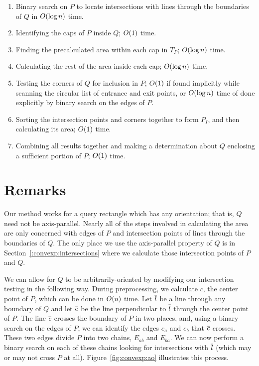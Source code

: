 \begin{enumerate}
 \item Binary search on $P$ to locate intersections with lines through the  boundaries of $Q$ in $O\!\left(\log{n}\right)$ time.
 
 \item Identifying the caps of $P$ inside $Q$; $O\!\left(1\right)$ time.

 \item Finding the precalculated area within each cap in $T_P$; $O\!\left(\log{n}\right)$ time.

 \item Calculating the rest of the area inside each cap; $O\!\left(\log{n}\right)$ time.

 \item Testing the corners of $Q$ for inclusion in $P$; $O\!\left(1\right)$ if found implicitly while scanning the circular list of entrance and exit points, or $O\!\left(\log{n}\right)$ time of done explicitly by binary search on the edges of $P$.
 
 \item Sorting the intersection points and corners together to form $P_I$, and then calculating its area; $O\!\left(1\right)$ time.
 
 \item Combining all results together and making a determination about $Q$ enclosing a sufficient portion of $P$; $O\!\left(1\right)$ time.
 
\end{enumerate}


\section{Remarks}
\label{:convexp:remarks}

Our method works for a query rectangle which has any orientation; that is, $Q$ need not be axis-parallel. Nearly all of the steps involved in calculating the area are only concerned with edges of $P$ and intersection points of lines through the boundaries of $Q$. The only place we use the axis-parallel property of $Q$ is in Section~\ref{:convexp:intersections} where we calculate those intersection points of $P$ and $Q$.

We can allow for $Q$ to be arbitrarily-oriented by modifying our intersection testing in the following way.  During preprocessing, we calculate $c$, the center point of $P$, which can be done in $O\!\left(n\right)$ time. Let $\overline{l}$ be a line through any boundary of $Q$ and let $\overline{c}$ be the line perpendicular to $\overline{l}$ through the center point of $P$.  The line $\overline{c}$ crosses the boundary of $P$ in two places, and, using a binary search on the edges of $P$, we can identify the edges $e_a$ and $e_b$ that $\overline{c}$ crosses. These two edges divide $P$ into two chains, $E_{ab}$ and $E_{ba}$. We can now perform a binary search on each of these chains looking for intersections with $\overline{l}$ (which may or may not cross $P$ at all). Figure~\ref{fig:convexp:ao} illustrates this process.

